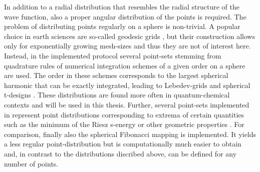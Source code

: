 In addition to a radial distribution that resembles the radial structure of the wave function, also a proper angular distribution of the points is required.
The problem of distributing points regularly on a sphere is non-trivial.
A popular choice in earth sciences are so-called geodesic grids \cite{geodesic1,geodesic2,geodes_charge}, but their construction allows only for exponentially growing mesh-sizes and thus they are not of interest here.
Instead, in the implemented protocol several point-sets stemming from quadrature rules of numerical integration schemes of a given order on a sphere are used.
The order in these schemes corresponds to the largest spherical harmonic that can be exactly integrated, leading to Lebedev-grids \cite{lebedev,lebedev2} and spherical t-designs \cite{t-design1, t-design2}.
These distributions are found more often in quantum-chemical contexts \cite{LebQC1,LebQC2,lebDFT,lebDFT2} and will be used in this thesis.
Further, several point-sets implemented in  represent point distributions corresponding to extrema of certain quantities such as the minimum of the Riesz s-energy\cite{fliegeMaier} or other geometric properties \cite{womersley,wom2,wom3}.
For comparison, finally also the spherical Fibonacci mapping \cite{fibonacci,fibonacci2} is implemented.
It yields a less regular point-distribution but is computationally much easier to obtain and, in contrast to the distributions discribed above, can be defined for any number of points.
